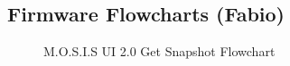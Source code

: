 \newpage
\subsection{Firmware Flowcharts (Fabio)}
\begin{figure}[H]
	\begin{center}
	\end{center}
	\caption{M.O.S.I.S UI 2.0 Get Snapshot Flowchart}
\end{figure}